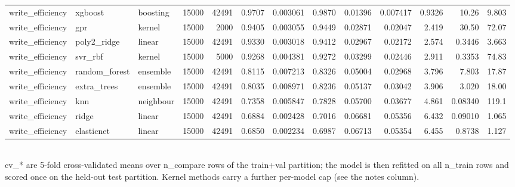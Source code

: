 \begin{table}[!t]
\begin{tabular}{lllrrrrrrrrrr}
write\_efficiency & xgboost & boosting & 15000 & 42491 & 0.9707 & 0.003061 & 0.9870 & 0.01396 & 0.007417 & 0.9326 & 10.26 & 9.803 \\
write\_efficiency & gpr & kernel & 15000 & 2000 & 0.9405 & 0.003055 & 0.9449 & 0.02871 & 0.02047 & 2.419 & 30.50 & 72.07 \\
write\_efficiency & poly2\_ridge & linear & 15000 & 42491 & 0.9330 & 0.003018 & 0.9412 & 0.02967 & 0.02172 & 2.574 & 0.3446 & 3.663 \\
write\_efficiency & svr\_rbf & kernel & 15000 & 5000 & 0.9268 & 0.004381 & 0.9272 & 0.03299 & 0.02446 & 2.911 & 0.3353 & 74.83 \\
write\_efficiency & random\_forest & ensemble & 15000 & 42491 & 0.8115 & 0.007213 & 0.8326 & 0.05004 & 0.02968 & 3.796 & 7.803 & 17.87 \\
write\_efficiency & extra\_trees & ensemble & 15000 & 42491 & 0.8035 & 0.008971 & 0.8236 & 0.05137 & 0.03042 & 3.906 & 3.020 & 18.00 \\
write\_efficiency & knn & neighbour & 15000 & 42491 & 0.7358 & 0.005847 & 0.7828 & 0.05700 & 0.03677 & 4.861 & 0.08340 & 119.1 \\
write\_efficiency & ridge & linear & 15000 & 42491 & 0.6884 & 0.002428 & 0.7016 & 0.06681 & 0.05356 & 6.432 & 0.09010 & 1.065 \\
write\_efficiency & elasticnet & linear & 15000 & 42491 & 0.6850 & 0.002234 & 0.6987 & 0.06713 & 0.05354 & 6.455 & 0.8738 & 1.127 \\
\bottomrule
\end{tabular}
\\[2pt] \footnotesize cv\_* are 5-fold cross-validated means over n\_compare rows of the train+val partition; the model is then refitted on all n\_train rows and scored once on the held-out test partition. Kernel methods carry a further per-model cap (see the notes column).
\end{table}
